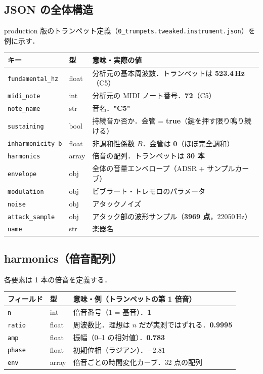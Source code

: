 \documentclass[uplatex,dvipdfmx,a4paper,10pt]{jsarticle}
\begin{document}
\subsection{JSON の全体構造}

production 版のトランペット定義（\texttt{0\_trumpets.tweaked.instrument.json}）を例に示す．

\begin{tabularx}{\textwidth}{llX}
\toprule
キー & 型 & 意味・実際の値 \\
\midrule
\texttt{fundamental\_hz} & float & 分析元の基本周波数．トランペットは \textbf{523.4\,Hz}（C5） \\
\texttt{midi\_note}      & int   & 分析元の MIDI ノート番号．\textbf{72}（C5） \\
\texttt{note\_name}      & str   & 音名．\textbf{"C5"} \\
\texttt{sustaining}      & bool  & 持続音か否か．金管 = \textbf{true}（鍵を押す限り鳴り続ける） \\
\texttt{inharmonicity\_b} & float & 非調和性係数 $B$．金管は \textbf{0}（ほぼ完全調和） \\
\texttt{harmonics}       & array & 倍音の配列．トランペットは \textbf{30 本} \\
\texttt{envelope}        & obj   & 全体の音量エンベロープ（ADSR + サンプルカーブ） \\
\texttt{modulation}      & obj   & ビブラート・トレモロのパラメータ \\
\texttt{noise}           & obj   & アタックノイズ \\
\texttt{attack\_sample}  & obj   & アタック部の波形サンプル（\textbf{3969 点}，22050\,Hz） \\
\texttt{name}            & str   & 楽器名 \\
\bottomrule
\end{tabularx}

\subsection{harmonics（倍音配列）}

各要素は 1 本の倍音を定義する．

\begin{tabularx}{\textwidth}{llX}
\toprule
フィールド & 型 & 意味・例（トランペットの第 1 倍音） \\
\midrule
\texttt{n}     & int   & 倍音番号（1 = 基音）．\textbf{1} \\
\texttt{ratio} & float & 周波数比．理想は $n$ だが実測ではずれる．\textbf{0.9995} \\
\texttt{amp}   & float & 振幅（0--1 の相対値）．\textbf{0.783} \\
\texttt{phase} & float & 初期位相（ラジアン）．\textbf{$-2.81$} \\
\texttt{env}   & array & 倍音ごとの時間変化カーブ．32 点の配列 \\
\bottomrule
\end{tabularx}
\end{document}

